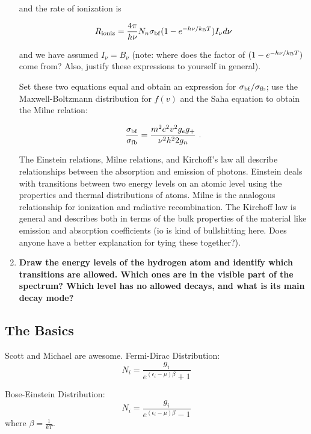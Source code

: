 \begin{enumerate}
      and the rate of ionization is
      
       \begin{equation}
      R_{\rm ioniz} = \frac{4\pi}{h\nu} N_n \sigma_{\rm bf} (1 - e^{-h\nu/k_{\rm B}T}) I_\nu d\nu
      \end{equation}
      
      and we have assumed $I_\nu = B_\nu$ (note: where does the factor of $(1 - e^{-h\nu/k_{\rm B}T})$ come from? Also, justify these expressions to yourself in general).
      
      Set these two equations equal and obtain an expression for $\sigma_{\rm bf} / \sigma_{\rm fb}$; use the Maxwell-Boltzmann distribution for $f(v)$ and the Saha equation to obtain the Milne relation:
      
      \begin{equation}
      \frac{\sigma_{\rm bf}}{\sigma_{\rm fb}} = \frac{m^2 c^2 v^2 g_e g_+}{\nu^2 h^2 2 g_n}\,\, .
      \end{equation}
      
      The Einstein relations, Milne relations, and Kirchoff's law all describe relationships between the absorption and emission of photons. Einstein deals with transitions between two energy levels on an atomic level using the properties and thermal distributions of atoms. Milne is the analogous relationship for ionization and radiative recombination. The Kirchoff law is general and describes both in terms of the bulk properties of the material like emission and absorption coefficients (io is kind of bullshitting here. Does anyone have a better explanation for tying these together?).
      
      
\item \textbf{Draw the energy levels of the hydrogen atom and identify which transitions are
      allowed. Which ones are in the visible part of the spectrum? Which level has no
      allowed decays, and what is its main decay mode?}
      
\end{enumerate}

\subsection{The Basics}
Scott and Michael are awesome.
Fermi-Dirac Distribution:
\begin{displaymath}N_i=\frac{g_i}{e^{(\epsilon_i-\mu)\beta}+1}\end{displaymath}

Bose-Einstein Distribution:
\begin{displaymath}N_i=\frac{g_i}{e^{(\epsilon_i-\mu)\beta}-1}\end{displaymath}
where $\beta=\frac{1}{kT}$.

